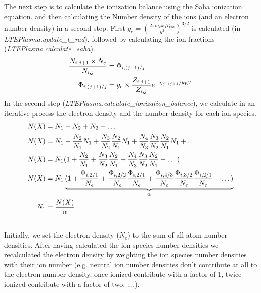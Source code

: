 \documentclass[letterpaper,10pt,english]{sphinxmanual}
\begin{document}
The next step is to calculate the ionization balance using the \href{http://en.wikipedia.org/wiki/Saha\_ionization\_equation}{Saha ionization equation}.
and then calculating the Number density of the ions (and an electron number density) in a second step.
First $g_e=\left(\frac{2 \pi m_e k_\textrm{B}T_\textrm{rad}}{h^2}\right)^{3/2}$ is calculated (in \emph{LTEPlasma.update\_t\_rad}),
followed by calculating the ion fractions (\emph{LTEPlasma.calculate\_saha}).
\begin{gather}
\begin{split}\frac{N_{i, j+1}\times N_e}{N_{i, j}} &= \Phi_{i, (j+1)/j} \\
\Phi_{i, (j+1)/j} &= g_e \times \frac{Z_{i, j+1}}{Z_{i, j}} e^{-\chi_{j\rightarrow j+1}/k_\textrm{B}T}\\\end{split}\notag
\end{gather}
In the second step (\emph{LTEPlasma.calculate\_ionization\_balance}), we calculate in an iterative process the electron density and the number density for each ion species.
\begin{gather}
\begin{split}N(X) &= N_1 + N_2 + N_3 + \dots\\
N(X) &= N_1 + \frac{N_2}{N_1} N_1 + \frac{N_3}{N_2}\frac{N_2}{N_1} N_1 + \frac{N_4}{N_3}\frac{N_3}{N_2}\frac{N_2}{N_1} N_1 + \dots\\
N(X) &= N_1 (1 + \frac{N_2}{N_1} + \frac{N_3}{N_2}\frac{N_2}{N_1} + \frac{N_4}{N_3}\frac{N_3}{N_2}\frac{N_2}{N_1} + \dots)\\
N(X) &= N_1 \underbrace{(1 + \frac{\Phi_{i, 2/1}}{N_e} + \frac{\Phi_{i, 2/2}}{N_e}\frac{\Phi_{i, 2/1}}{N_e} +
        \frac{\Phi_{i, 4/3}}{N_e}\frac{\Phi_{i, 3/2}}{N_e}\frac{\Phi_{i, 2/1}}{N_e} + \dots)}_{\alpha}\\
N_1 &= \frac{N(X)}{\alpha}\end{split}\notag\\\begin{split}\end{split}\notag
\end{gather}
Initially, we set the electron density ($N_e$) to the sum of all atom number densities. After having calculated the
ion species number densities we recalculated the electron density by weighting the ion species number densities with their
ion number (e.g. neutral ion number densities don't contribute at all to the electron number density, once ionized contribute with a
factor of 1, twice ionized contribute with a factor of two, ....).
\end{document}
